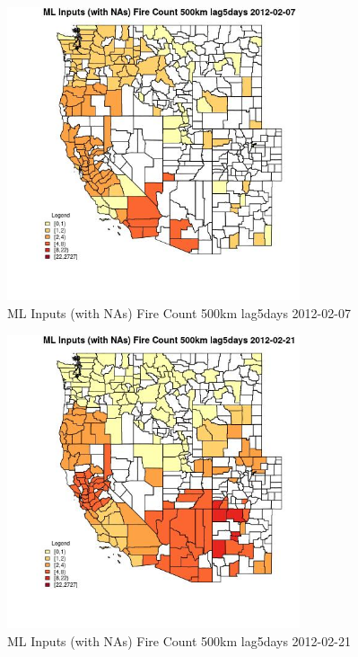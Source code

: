 \begin{figure} 
\centering  
\includegraphics[width=0.77\textwidth]{Code_Outputs/Report_ML_input_PM25_Step4_part_f_de_duplicated_aves_prioritize_24hr_obswNAs_CountyFire_Count_500km_lag5daysMean2012-02-07.jpg} 
\caption{\label{fig:Report_ML_input_PM25_Step4_part_f_de_duplicated_aves_prioritize_24hr_obswNAsCountyFire_Count_500km_lag5daysMean2012-02-07}ML Inputs (with NAs) Fire Count 500km lag5days 2012-02-07} 
\end{figure} 
 

\begin{figure} 
\centering  
\includegraphics[width=0.77\textwidth]{Code_Outputs/Report_ML_input_PM25_Step4_part_f_de_duplicated_aves_prioritize_24hr_obswNAs_CountyFire_Count_500km_lag5daysMean2012-02-21.jpg} 
\caption{\label{fig:Report_ML_input_PM25_Step4_part_f_de_duplicated_aves_prioritize_24hr_obswNAsCountyFire_Count_500km_lag5daysMean2012-02-21}ML Inputs (with NAs) Fire Count 500km lag5days 2012-02-21} 
\end{figure} 
 

